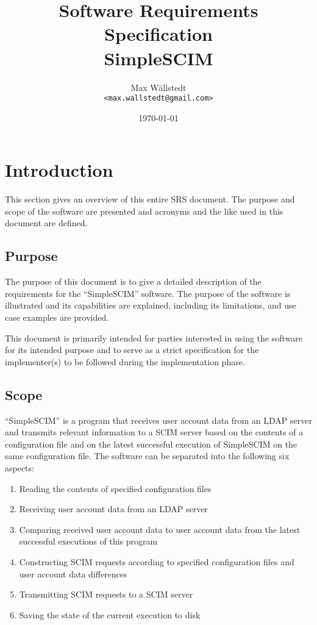 \documentclass[12pt,twoside,a4paper,titlepage]{article}
\title{Software Requirements Specification \\ \large SimpleSCIM}
\author{Max Wällstedt \\ \texttt{<max.wallstedt@gmail.com>}}
\date{\today}
\begin{document}
 \maketitle

 \tableofcontents

 \newpage

 \section{Introduction}

 This section gives an overview of this entire SRS document. The
 purpose and scope of the software are presented and acronyms and the
 like used in this document are defined.

  \subsection{Purpose}

  The purpose of this document is to give a detailed description of
  the requirements for the ``SimpleSCIM'' software. The purpose of
  the software is illustrated and its capabilities are explained,
  including its limitations, and use case examples are provided.

  This document is primarily intended for parties interested in using
  the software for its intended purpose and to serve as a strict
  specification for the implementer(s) to be followed during the
  implementation phase.

  \subsection{Scope}

  ``SimpleSCIM'' is a program that receives user account data from an
  LDAP server and transmits relevant information to a SCIM server
  based on the contents of a configuration file and on the latest
  successful execution of SimpleSCIM on the same configuration file.
  The software can be separated into the following six aspects:

  \begin{enumerate}
   \item
    Reading the contents of specified configuration files

   \item
    Receiving user account data from an LDAP server

   \item
    Comparing received user account data to user account data from
    the latest successful executions of this program

   \item
    Constructing SCIM requests according to specified configuration
    files and user account data differences

   \item
    Transmitting SCIM requests to a SCIM server

   \item
    Saving the state of the current execution to disk
  \end{enumerate}
\end{document}
